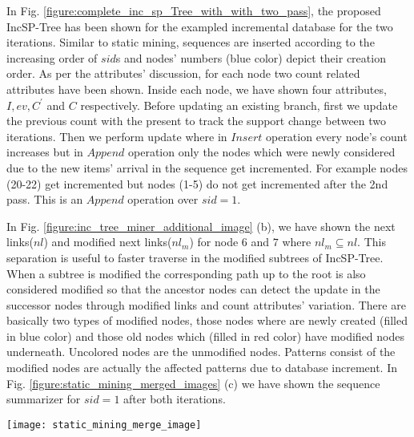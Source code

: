 In Fig. \ref{figure:complete_inc_sp_Tree_with_with_two_pass}, the proposed IncSP-Tree has been shown for the exampled incremental database for the two iterations. Similar to static mining, sequences are inserted according to the increasing order of $sid$s and nodes' numbers (blue color) depict their creation order. As per the attributes' discussion, for each node two count related attributes have been shown. Inside each node, we have shown four attributes, $I,ev,C^{\prime}$ and $C$ respectively. Before updating an existing branch, first we update the previous count with the present to track the support change between two iterations. Then we perform update where in $Insert$ operation every node's count increases but in $Append$ operation only the nodes which were newly considered due to the new items' arrival in the sequence get incremented. For example nodes (20-22) get incremented but nodes (1-5) do not get incremented after the 2nd pass. This is an $Append$ operation over $sid=1$. 

In Fig. \ref{figure:inc_tree_miner_additional_image} (b), we have shown the next links($nl$) and modified next links($nl_{m}$) for node $6$ and $7$ where $nl_{m} \subseteq nl$. This separation is useful to faster traverse in the modified subtrees of IncSP-Tree. When a subtree is modified the corresponding path up to the root is also considered modified so that the ancestor nodes can detect the update in the successor nodes through modified links and count attributes' variation. There are basically two types of modified nodes, those nodes where are newly created (filled in blue color) and those old nodes which (filled in red color) have modified nodes underneath. Uncolored nodes are the unmodified nodes. Patterns consist of the modified nodes are actually the affected patterns due to database increment. In Fig. \ref{figure:static_mining_merged_images} (c) we have shown the sequence summarizer for $sid=1$ after both iterations.


\begin{figure*}[!tb]
\centering
\texttt{[image: static\_mining\_merge\_image]}
\caption{(a) Terminologies for static mining (b) Co-Existing Item Table, (c) Example of sequence summarizer structure for $sid=1$, (d) Pattern Generation Example, (e) Breadth-First based support counting Technique, (f) Pattern Formation Concepts} \label{figure:static_mining_merged_images}
\hfil
\end{figure*}

